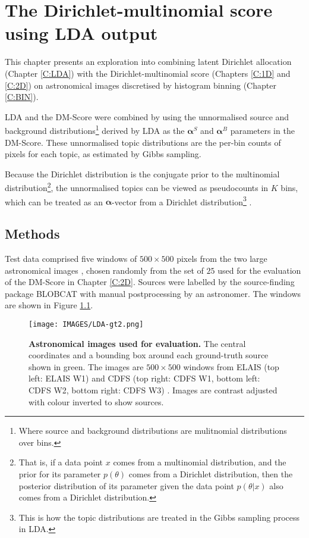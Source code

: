 \chapter[Dirichlet-multinomial score with LDA output]{The Dirichlet-multinomial score using LDA output}\label{C:2D-LDA}

This chapter presents an exploration into combining latent Dirichlet allocation (Chapter \ref{C:LDA}) with the Dirichlet-multinomial score (Chapters \ref{C:1D} and \ref{C:2D}) on astronomical images discretised by histogram binning (Chapter \ref{C:BIN}).

LDA and the DM-Score were combined by using the unnormalised source and background distributions\footnote{Where source and background distributions are mulitnomial distributions over bins.} derived by LDA as the $\boldsymbol{\alpha}^S$ and $\boldsymbol{\alpha}^B$ parameters in the DM-Score. These unnormalised topic distributions are the per-bin counts of pixels for each topic, as estimated by Gibbs sampling.

Because the Dirichlet distribution is the conjugate prior to the multinomial distribution\footnote{That is, if a data point $x$ comes from a multinomial distribution, and the prior for its parameter $p(\theta)$ comes from a Dirichlet distribution, then the posterior distribution of its parameter given the data point $p(\theta|x)$ also comes from a Dirichlet distribution.}, the unnormalised topics can be viewed as pseudocounts in $K$ bins, which can be treated as an $\boldsymbol{\alpha}$-vector from a Dirichlet distribution\footnote{This is how the topic distributions are treated in the Gibbs sampling process in LDA.} \cite{kotz2004continuous,ng2011dirichlet,steyvers2007probabilistic}.

\section{Methods}
Test data comprised five windows of $500 \times 500$ pixels from the two large astronomical images \cite{norris2006deep}, chosen randomly from the set of $25$  used for the evaluation of the DM-Score in Chapter \ref{C:2D}. Sources were labelled by the source-finding package BLOBCAT \cite{hales2012blobcat} with manual postprocessing by an astronomer. The windows are shown in Figure \ref{fig:real-data-2d-ldadm}.

\begin{figure}
\centering
\texttt{[image: IMAGES/LDA-gt2.png]}
\caption[Astronomical images used for evaluation]{\textbf{Astronomical images used for evaluation.} The central coordinates and a bounding box around each ground-truth source shown in green. The images are $500 \times 500$ windows from ELAIS (top left: ELAIS W1) and CDFS (top right: CDFS W1, bottom left: CDFS W2, bottom right: CDFS W3) \cite{norris2006deep}. Images are contrast adjusted with colour inverted to show sources.}
\label{fig:real-data-2d-ldadm}
\end{figure}

